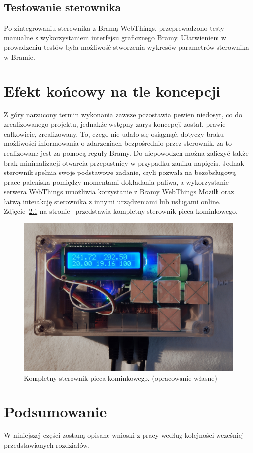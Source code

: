 \documentclass[11pt]{report}
\begin{document}
  \section{Testowanie sterownika}
 Po zintegrowaniu sterownika z Bramą WebThings, przeprowadzono testy manualne z wykorzystaniem interfejsu graficznego Bramy. Ułatwieniem w prowadzeniu testów była możliwość stworzenia wykresów parametrów sterownika w Bramie. 
 
 \chapter{Efekt końcowy na tle koncepcji}
 Z góry narzucony termin wykonania zawsze pozostawia pewien niedosyt, co do zrealizowanego projektu, jednakże wstępny zarys koncepcji został, prawie całkowicie, zrealizowany. To, czego nie udało się osiągnąć, dotyczy
 braku możliwości informowania o zdarzeniach bezpośrednio przez sterownik, za to realizowane jest za pomocą reguły Bramy. Do niepowodzeń można zaliczyć także brak minimalizacji otwarcia przepustnicy w przypadku zaniku napięcia.
 Jednak sterownik spełnia swoje podstawowe zadanie, czyli pozwala na bezobsługową prace paleniska pomiędzy momentami dokładania paliwa, a wykorzystanie serwera WebThings umożliwia korzystanie z Bramy WebThings Mozilli oraz łatwą interakcję sterownika z innymi urządzeniami lub usługami online.
    Zdjęcie~\ref{fig:sterownik} na stronie~\pageref{fig:sterownik} przedstawia kompletny sterownik pieca kominkowego.
\begin{figure}[ht]
\centering
\includegraphics[width=0.8 \textwidth]{fig/sterownik.jpg}
\caption{Kompletny sterownik pieca kominkowego. (opracowanie własne)}
\label{fig:sterownik}
\end{figure}
 
 
 \chapter{Podsumowanie}
W niniejszej części zostaną opisane wnioski z pracy według kolejności wcześniej przedstawionych rozdziałów.
\end{document}
